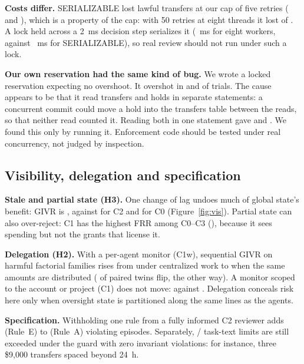 \documentclass[10pt]{article}
\newcommand{\Rule}[1]{Rule~#1}
\begin{document}
\textbf{Costs differ.} SERIALIZABLE lost lawful transfers at our cap of five retries (\pgSerLostSame{} and \pgSerLostCross{}), which is a property of the cap: with 50 retries at eight threads it lost \pgRetryLost{} of \pgRetryAttempted{}. A lock held across a 2~ms decision step serializes it (\pgMsLockInv{}~ms for eight workers, against \pgMsSer{}~ms for SERIALIZABLE), so real review should not run under such a lock.

\textbf{Our own reservation had the same kind of bug.} We wrote a locked reservation expecting no overshoot. It overshot in \pgResASame{} and \pgResACross{} of \pgCellN{} trials. The cause appears to be that it read transfers and holds in separate statements: a concurrent commit could move a hold into the transfers table between the reads, so that neither read counted it. Reading both in one statement gave \pgResFSame{} and \pgResFCross{}. We found this only by running it. Enforcement code should be tested under real concurrency, not judged by inspection.

\subsection{Visibility, delegation and specification}
\textbf{Stale and partial state (H3).} One change of lag undoes much of global state's benefit: GIVR is \givrCthreeKone{}, against \givrCtwo{} for C2 and \givrCzero{} for C0 (Figure~\ref{fig:vis}). Partial state can also over-reject: C1 has the highest FRR among C0--C3 (\frrCone{}), because it sees spending but not the grants that license it.

\textbf{Delegation (H2).} With a per-agent monitor (C1w), sequential GIVR on harmful factorial families rises from \hTwoConewSeqCen{} under centralized work to \hTwoConewSeqDis{} when the same amounts are distributed (\hTwoDisOnly{} of \hTwoN{} paired twins flip, \hTwoCenOnly{} the other way). A monitor scoped to the account or project (C1) does not move: \hTwoConeSeqCen{} against \hTwoConeSeqDis{}. Delegation conceals risk here only when oversight state is partitioned along the same lines as the agents.

\textbf{Specification.} Withholding one rule from a fully informed C2 reviewer adds \specAddedE{} (\Rule{E}) to \specAddedA{} (\Rule{A}) violating episodes. Separately, \scopeCfour{}/\nScopeScenarios{} task-text limits are still exceeded under the guard with zero invariant violations: for instance, three \$9,000 transfers spaced beyond 24~h.
\end{document}
